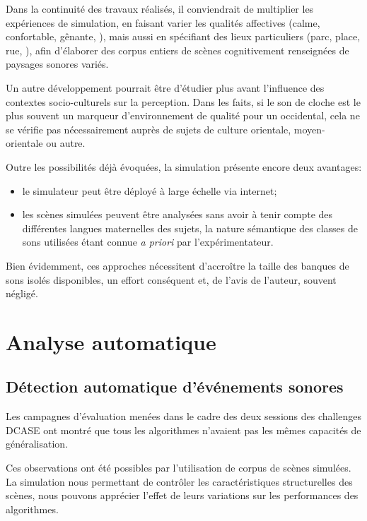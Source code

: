 Dans la continuité des travaux réalisés, il conviendrait de multiplier les expériences de simulation, en faisant varier les qualités affectives (calme, confortable, gênante, \etc), mais aussi en spécifiant des lieux particuliers (parc, place, rue, \etc), afin d'élaborer des corpus entiers de scènes cognitivement renseignées de paysages sonores variés.

Un autre développement pourrait être d'étudier plus avant l'influence des contextes socio-culturels sur la perception. Dans les faits, si le son de cloche est le plus souvent un marqueur d'environnement de qualité pour un occidental, cela ne se vérifie pas nécessairement auprès de sujets de culture orientale, moyen-orientale ou autre. 

Outre les possibilités déjà évoquées, la simulation présente encore deux avantages:

\begin{itemize}
\item le simulateur peut être déployé à large échelle via internet;
\item les scènes simulées peuvent être analysées sans avoir à tenir compte des différentes langues maternelles des sujets, la nature sémantique des classes de sons utilisées étant connue \emph{a priori} par l'expérimentateur.
\end{itemize}

Bien évidemment, ces approches nécessitent d'accroître la taille des banques de sons isolés disponibles, un effort conséquent et, de l'avis de l'auteur, souvent négligé.

\section{Analyse automatique}

\subsection{Détection automatique d'événements sonores}

Les campagnes d'évaluation menées dans le cadre des deux sessions des challenges DCASE ont montré que tous les algorithmes n'avaient pas les mêmes capacités de généralisation.

Ces observations ont été possibles par l'utilisation de corpus de scènes simulées. La simulation nous permettant de contrôler les caractéristiques structurelles des scènes, nous pouvons apprécier l’effet de leurs variations sur les performances des algorithmes.

